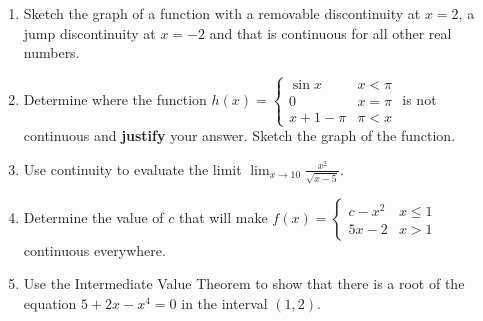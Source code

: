 \documentclass[11pt,fleqn]{article}
\begin{document}
\setlength{\parindent}{0cm}
\renewcommand{\headrulewidth}{0pt}
\newcommand{\blank}[1]{\rule{#1}{0.75pt}}
\renewcommand{\d}{\displaystyle}
\vspace*{-0.9in}
\begin{center}
  \large {}
\end{center}
\small
\begin{enumerate}
\item Sketch the graph of a function with a removable discontinuity at $x=2$, a jump discontinuity at $x=-2$ and that is continuous for all other real numbers.
\vspace{2in}
\item Determine where the function $h(x)=\begin{cases} \sin x & x < \pi \\ 0 &  x =\pi \\ x+1-\pi & \pi < x
\end{cases}$ is not continuous and \textbf{justify} your answer. Sketch the graph of the function.
\vfill
\item Use continuity to evaluate the limit $\displaystyle{\lim_{x \to 10} \frac{x^2}{\sqrt{x-5}}}.$ 
\vspace{1in}
\newpage
\item Determine the value of $c$ that will make $f(x)=\begin{cases} c-x^2 & x\leq 1 \\ 5x-2 & x > 1\end{cases}$ continuous everywhere.
\vfill
\item Use the Intermediate Value Theorem to show that there is a root of the equation $5+2x-x^4=0$ in the interval $(1,2).$
\vfill

\end{enumerate}
 
\end{document}
